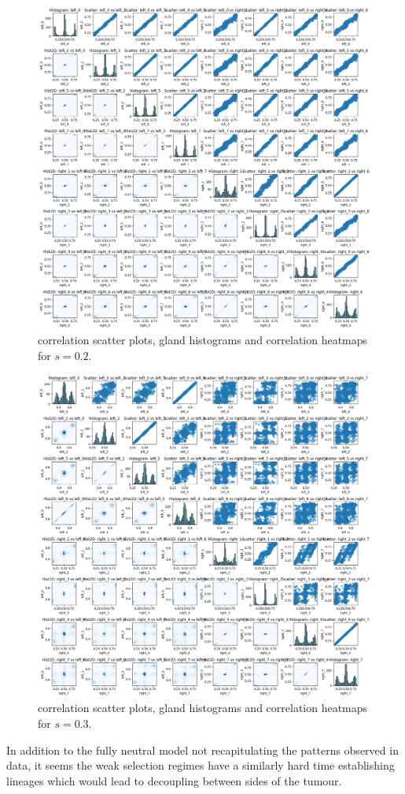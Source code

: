 \begin{figure}[h]
    \centering
    \includegraphics[width=\textwidth]{Chapter_5/figures/sensitivity_selective_advantage2.png}
    \caption{correlation scatter plots, gland histograms and correlation heatmaps for $s=0.2$.}
    \label{fig:sensitivity_selective_advantage2}
\end{figure}
\begin{figure}[h]
    \centering
    \includegraphics[width=\textwidth]{Chapter_5/figures/sensitivity_selective_advantage3.png}
    \caption{correlation scatter plots, gland histograms and correlation heatmaps for $s=0.3$.}
    \label{fig:sensitivity_selective_advantage3}
\end{figure}
In addition to the fully neutral model not recapitulating the patterns observed in data, it seems the weak selection regimes have a similarly hard time establishing lineages which would lead to decoupling between sides of the tumour.
\clearpage
